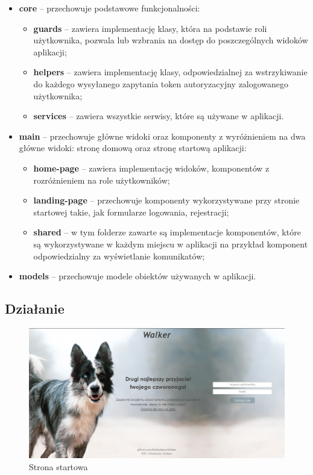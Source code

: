\begin{itemize}[leftmargin=1cm]
  \item \textbf{core} -- przechowuje podstawowe funkcjonalności:
  \begin{itemize}
    \item \textbf{guards} -- zawiera implementację klasy, która na podstawie roli użytkownika, pozwala lub wzbrania na dostęp do poszczególnych widoków aplikacji;
    \item \textbf{helpers} -- zawiera implementację klasy, odpowiedzialnej za wstrzykiwanie do każdego wysyłanego zapytania token autoryzacyjny zalogowanego użytkownika;
    \item \textbf{services} -- zawiera wszystkie serwisy, które są używane w aplikacji.
  \end{itemize}
  \item \textbf{main} -- przechowuje główne widoki oraz komponenty z wyróżnieniem na dwa główne widoki: stronę domową oraz stronę startową aplikacji:
  \begin{itemize}
    \item \textbf{home-page} -- zawiera implementację widoków, komponentów z rozróżnieniem na role użytkowników;
    \item \textbf{landing-page} -- przechowuje komponenty wykorzystywane przy stronie startowej takie, jak formularze logowania, rejestracji;
    \item \textbf{shared} -- w tym folderze zawarte są implementacje komponentów, które są wykorzystywane w każdym miejscu w aplikacji na przykład komponent odpowiedzialny za wyświetlanie komunikatów;
  \end{itemize}
  \item \textbf{models} -- przechowuje modele obiektów używanych w aplikacji.
\end{itemize}

\subsection{Działanie}
\begin{figure}[H]
  \centering
  \includegraphics[width=1\linewidth]{rysunki/walker-1.PNG}
  \caption{Strona startowa}
  \label{fig:walker-landing-page}
\end{figure}


